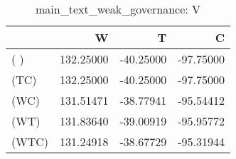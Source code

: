 \begin{table}
\centering
\caption{main_text_weak_governance: V}
\begin{tabular}{lrrr}
\toprule
{} &         W &         T &         C \\
\midrule
( )   & 132.25000 & -40.25000 & -97.75000 \\
(TC)  & 132.25000 & -40.25000 & -97.75000 \\
(WC)  & 131.51471 & -38.77941 & -95.54412 \\
(WT)  & 131.83640 & -39.00919 & -95.95772 \\
(WTC) & 131.24918 & -38.67729 & -95.31944 \\
\bottomrule
\end{tabular}
\end{table}
